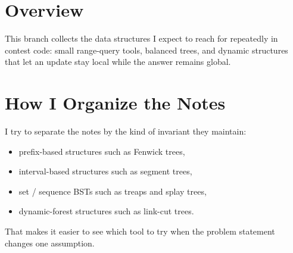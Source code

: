 \section*{Overview}

This branch collects the data structures I expect to reach for repeatedly in contest code: small range-query tools,
balanced trees, and dynamic structures that let an update stay local while the answer remains global.

\section*{How I Organize the Notes}

I try to separate the notes by the kind of invariant they maintain:

\begin{itemize}
  \item prefix-based structures such as Fenwick trees,
  \item interval-based structures such as segment trees,
  \item set / sequence BSTs such as treaps and splay trees,
  \item dynamic-forest structures such as link-cut trees.
\end{itemize}

That makes it easier to see which tool to try when the problem statement changes one assumption.
